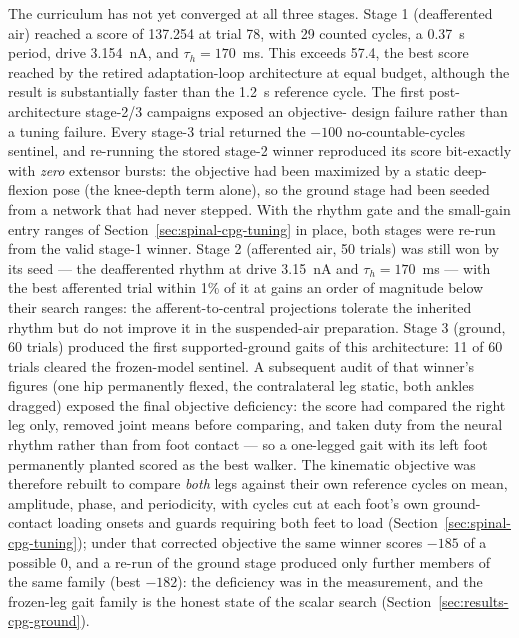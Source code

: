 The curriculum has not yet converged at all three stages. Stage 1
(deafferented air) reached a score of 137.254 at trial 78, with 29
counted cycles, a 0.37~s period, drive 3.154~nA, and
$\tau_h=170$~ms. This exceeds 57.4, the best score reached by the
retired adaptation-loop architecture at equal budget, although the
result is substantially faster than the 1.2~s reference cycle.
The first post-architecture stage-2/3 campaigns exposed an objective-
design failure rather than a tuning failure. Every stage-3 trial
returned the $-100$ no-countable-cycles sentinel, and re-running the
stored stage-2 winner reproduced its score bit-exactly with
\emph{zero} extensor bursts: the objective had been maximized by a
static deep-flexion pose (the knee-depth term alone), so the ground
stage had been seeded from a network that had never stepped. With the
rhythm gate and the small-gain entry ranges of
Section~\ref{sec:spinal-cpg-tuning} in place, both stages were re-run
from the valid stage-1 winner. Stage 2 (afferented air, 50 trials) was
still won by its seed --- the deafferented rhythm at drive 3.15~nA and
$\tau_h=170$~ms --- with the best afferented trial within 1\% of it at
gains an order of magnitude below their search ranges: the
afferent-to-central projections tolerate the inherited rhythm but do
not improve it in the suspended-air preparation. Stage 3 (ground, 60
trials) produced the first supported-ground gaits of this
architecture: 11 of 60 trials cleared the frozen-model sentinel.
A subsequent audit of that winner's figures (one hip permanently
flexed, the contralateral leg static, both ankles dragged) exposed the
final objective deficiency: the score had compared the right leg only,
removed joint means before comparing, and taken duty from the neural
rhythm rather than from foot contact — so a one-legged gait with its
left foot permanently planted scored as the best walker. The kinematic
objective was therefore rebuilt to compare \emph{both} legs against
their own reference cycles on mean, amplitude, phase, and periodicity,
with cycles cut at each foot's own ground-contact loading onsets and
guards requiring both feet to load (Section~\ref{sec:spinal-cpg-tuning});
under that corrected objective the same winner scores $-185$ of a
possible 0, and a re-run of the ground stage produced only further
members of the same family (best $-182$): the deficiency was in the
measurement, and the frozen-leg gait family is the honest state of the
scalar search (Section~\ref{sec:results-cpg-ground}).

